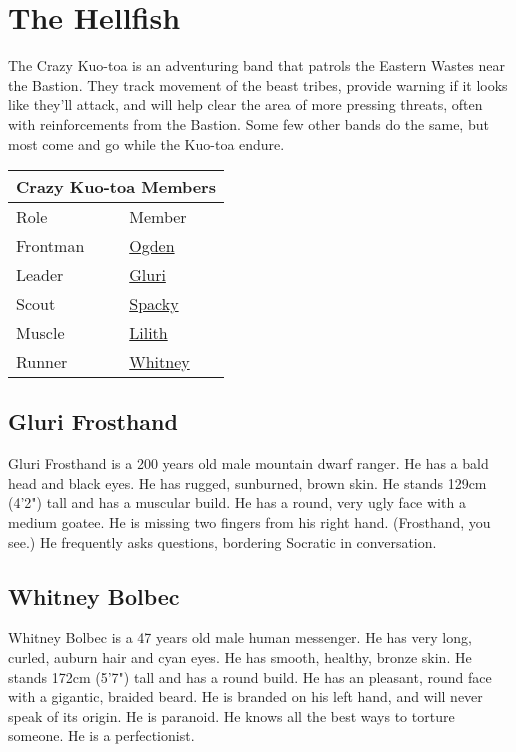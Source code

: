 \section{The Hellfish}

The Crazy Kuo-toa is an adventuring band that patrols the Eastern Wastes near the Bastion.
They track movement of the beast tribes, provide warning if it looks like they'll attack, and will
  help clear the area of more pressing threats, often with reinforcements from the Bastion.
Some few other bands do the same, but most come and go while the Kuo-toa endure.

\bigskip
\begin{center}
\begin{tabular}{|l|l|}
\hline
\multicolumn{2}{|c|}{Crazy Kuo-toa Members}\\
\hline
Role & Member \\
\hline
Frontman & \hyperref[subsec:ogden]{Ogden} \\
Leader   & \hyperref[subsec:gluri]{Gluri} \\
Scout    & \hyperref[subsec:spacky]{Spacky} \\
Muscle   & \hyperref[subsec:alotel]{Lilith} \\
Runner   & \hyperref[subsec:whitney]{Whitney} \\
\hline
\end{tabular}
\end{center}

\subsection{Gluri Frosthand}\label{subsec:gluri}

Gluri Frosthand is a 200 years old male mountain dwarf ranger.
He has a bald head and black eyes.
He has rugged, sunburned, brown skin.
He stands 129cm (4'2") tall and has a muscular build.
He has a round, very ugly face with a medium goatee.
He is missing two fingers from his right hand.
(Frosthand, you see.)
He frequently asks questions, bordering Socratic in conversation.

\subsection{Whitney Bolbec}\label{subsec:whitney}

Whitney Bolbec is a 47 years old male human messenger.
He has very long, curled, auburn hair and cyan eyes.
He has smooth, healthy, bronze skin.
He stands 172cm (5'7") tall and has a round build.
He has an pleasant, round face with a gigantic, braided beard.
He is branded on his left hand, and will never speak of its origin.
He is paranoid.
He knows all the best ways to torture someone.
He is a perfectionist.

